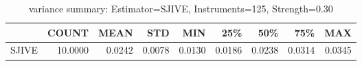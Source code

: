 \begin{table}[ht]
\centering
\caption{variance summary: Estimator=SJIVE, Instruments=125, Strength=0.30}
\begin{tabular}{lrrrrrrrr}
\toprule
 & COUNT & MEAN & STD & MIN & 25\% & 50\% & 75\% & MAX \\
\midrule
SJIVE & 10.0000 & 0.0242 & 0.0078 & 0.0130 & 0.0186 & 0.0238 & 0.0314 & 0.0345 \\
\bottomrule
\end{tabular}
\end{table}
